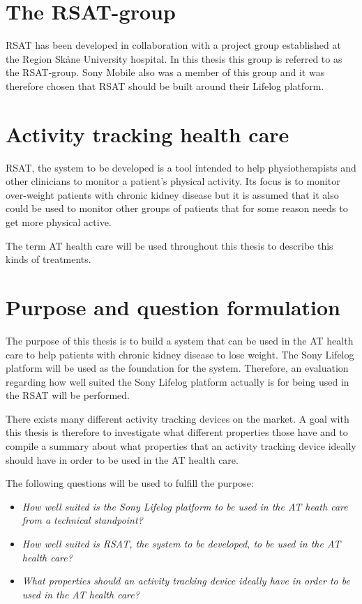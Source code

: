 \documentclass{cslthse-msc}
\begin{document}
\section{The RSAT-group}
RSAT has been developed in collaboration with a project group established at the Region Skåne University hospital. In this thesis this group is referred to as the RSAT-group. Sony Mobile also was a member of this group and it was therefore chosen that RSAT should be built around their Lifelog platform.

\section{Activity tracking health care}
RSAT, the system to be developed is a tool intended to help physiotherapists and other clinicians to monitor a patient's physical activity. Its focus is to monitor over-weight patients with chronic kidney disease but it is assumed that it also could be used to monitor other groups of patients that for some reason needs to get more physical active.

The term AT health care will be used throughout this thesis to describe this kinds of treatments.



\section{Purpose and question formulation}
\label{sec:questions}

The purpose of this thesis is to build a system that can be used in the AT health care to help patients with chronic kidney disease to lose weight. The Sony Lifelog platform will be used as the foundation for the system. Therefore, an evaluation regarding how well suited the Sony Lifelog platform actually is for being used in the RSAT will be performed. 

There exists many different activity tracking devices on the market. A goal with this thesis is therefore to investigate what different properties those have and to compile a summary about what properties that an activity tracking device ideally should have in order to be used in the AT health care. 

The following questions will be used to fulfill the purpose: 

\begin{itemize}
    \item \emph{How well suited is the Sony Lifelog platform to be used in the AT heath care from a technical standpoint?}

    \item \emph{How well suited is RSAT, the system to be developed, to be used in the AT health care?}
    \item \emph{What properties should an activity tracking device ideally have in order to be used in the AT health care?}
\end{itemize}
\end{document}
